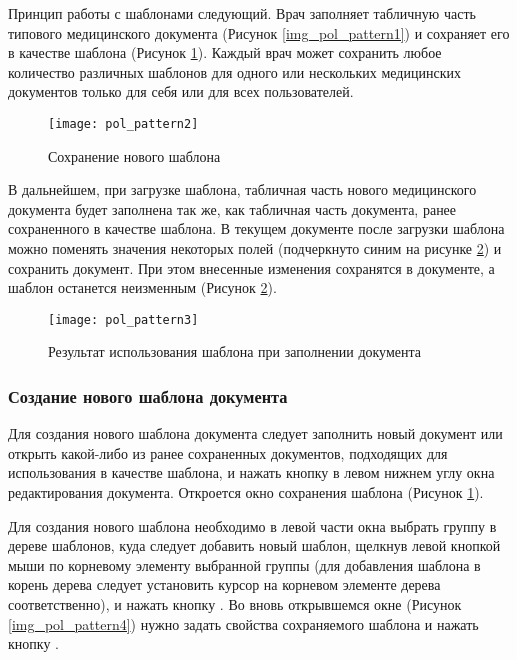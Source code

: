 Принцип работы с шаблонами следующий. Врач заполняет табличную часть типового медицинского документа (Рисунок \ref{img_pol_pattern1}) и сохраняет его в качестве шаблона (Рисунок \ref{img_pol_pattern2}). Каждый врач может сохранить любое количество различных шаблонов для одного или нескольких медицинских документов только для себя или для всех пользователей.
 
 \begin{figure}[ht!]\centering
   \texttt{[image: pol\_pattern2]}
   \caption{Сохранение нового шаблона}
   \label{img_pol_pattern2}
 \end{figure}
 
В дальнейшем, при загрузке шаблона, табличная часть нового медицинского документа будет заполнена так же, как табличная часть документа, ранее сохраненного в качестве шаблона. В текущем документе после загрузки шаблона можно поменять значения некоторых полей (подчеркнуто синим на рисунке \ref{img_pol_pattern3}) и сохранить документ. При этом внесенные изменения сохранятся в документе, а шаблон останется неизменным (Рисунок \ref{img_pol_pattern3}).

 \begin{figure}[h!]\centering
   \texttt{[image: pol\_pattern3]}
   \caption{Результат использования шаблона при заполнении документа}
   \label{img_pol_pattern3}
 \end{figure}
 
\subsubsection{Создание нового шаблона документа} 

Для создания нового шаблона документа следует заполнить новый документ или открыть какой-либо из ранее сохраненных документов, подходящих для использования в качестве шаблона, и нажать кнопку  в левом нижнем углу окна редактирования документа. Откроется окно сохранения шаблона (Рисунок \ref{img_pol_pattern2}).

Для создания нового шаблона необходимо в левой части окна выбрать группу в дереве шаблонов, куда следует добавить новый шаблон, щелкнув левой кнопкой мыши по корневому элементу выбранной группы (для добавления шаблона в корень дерева следует установить курсор на корневом элементе дерева соответственно), и нажать кнопку . Во вновь открывшемся окне (Рисунок \ref{img_pol_pattern4}) нужно задать свойства сохраняемого шаблона и нажать кнопку . 

